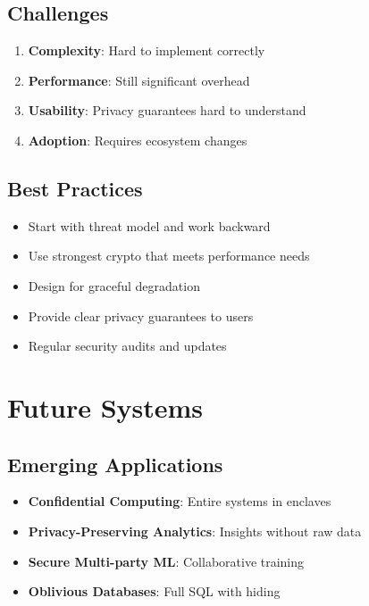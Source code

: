 \documentclass[11pt,final,hidelinks]{article}
\begin{document}
\subsection{Challenges}

\begin{enumerate}
    \item \textbf{Complexity}: Hard to implement correctly
    \item \textbf{Performance}: Still significant overhead
    \item \textbf{Usability}: Privacy guarantees hard to understand
    \item \textbf{Adoption}: Requires ecosystem changes
\end{enumerate}

\subsection{Best Practices}

\begin{itemize}
    \item Start with threat model and work backward
    \item Use strongest crypto that meets performance needs
    \item Design for graceful degradation
    \item Provide clear privacy guarantees to users
    \item Regular security audits and updates
\end{itemize}

\section{Future Systems}

\subsection{Emerging Applications}

\begin{itemize}
    \item \textbf{Confidential Computing}: Entire systems in enclaves
    \item \textbf{Privacy-Preserving Analytics}: Insights without raw data
    \item \textbf{Secure Multi-party ML}: Collaborative training
    \item \textbf{Oblivious Databases}: Full SQL with hiding
\end{itemize}
\end{document}
